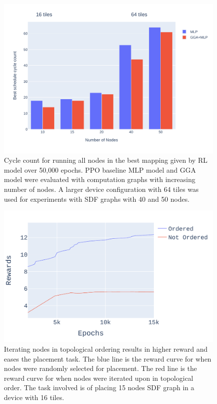\begin{figure}[tb]
  \centering
  \includegraphics[width=\linewidth]{fig/nodes_graph.pdf}
  \caption{Cycle count for running all nodes in the best mapping given by RL model over 50,000 epochs. 
  PPO baseline MLP model and GGA model were evaluated with computation graphs with increasing number of nodes. 
  A larger device configuration with 64 tiles was used for experiments with SDF graphs with 40 and 50 nodes. }
  \label{fig:nodes_graph}
\end{figure}

\begin{figure}[tb]
  \centering
  \includegraphics[width=\linewidth]{fig/plot_ordered.pdf}
  \caption{Iterating nodes in topological ordering results in higher reward and eases the placement task. 
 The blue line is the reward curve for when nodes were randomly selected for placement. 
 The red line is the reward curve for when nodes were iterated upon in topological order. 
 The task involved is of placing 15 nodes SDF graph in a device with 16 tiles.}
  \label{fig:ordered_placement}
\end{figure}

